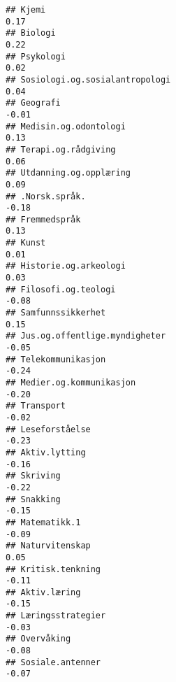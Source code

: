 \documentclass[
]{article}
\begin{document}
\begin{verbatim}
## Kjemi                                                                             0.17
## Biologi                                                                           0.22
## Psykologi                                                                         0.02
## Sosiologi.og.sosialantropologi                                                    0.04
## Geografi                                                                         -0.01
## Medisin.og.odontologi                                                             0.13
## Terapi.og.rådgiving                                                               0.06
## Utdanning.og.opplæring                                                            0.09
## .Norsk.språk.                                                                    -0.18
## Fremmedspråk                                                                      0.13
## Kunst                                                                             0.01
## Historie.og.arkeologi                                                             0.03
## Filosofi.og.teologi                                                              -0.08
## Samfunnssikkerhet                                                                 0.15
## Jus.og.offentlige.myndigheter                                                    -0.05
## Telekommunikasjon                                                                -0.24
## Medier.og.kommunikasjon                                                          -0.20
## Transport                                                                        -0.02
## Leseforståelse                                                                   -0.23
## Aktiv.lytting                                                                    -0.16
## Skriving                                                                         -0.22
## Snakking                                                                         -0.15
## Matematikk.1                                                                     -0.09
## Naturvitenskap                                                                    0.05
## Kritisk.tenkning                                                                 -0.11
## Aktiv.læring                                                                     -0.15
## Læringsstrategier                                                                -0.03
## Overvåking                                                                       -0.08
## Sosiale.antenner                                                                 -0.07

\end{verbatim}
\end{document}
